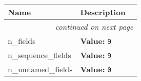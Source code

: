     \vspace{-1cm}
\hspace{\varindent}\begin{longtable}{|p{\varnamewidth}|p{\vardescrwidth}|l}
\cline{1-2}
\cline{1-2} \centering \textbf{Name} & \centering \textbf{Description}& \\
\cline{1-2}
\endhead\cline{1-2}\multicolumn{3}{r}{\small\textit{continued on next page}}\\\endfoot\cline{1-2}
\endlastfoot\raggedright n\-\_\-f\-i\-e\-l\-d\-s\- & \raggedright \textbf{Value:} 
{\tt 9}&\\
\cline{1-2}
\raggedright n\-\_\-s\-e\-q\-u\-e\-n\-c\-e\-\_\-f\-i\-e\-l\-d\-s\- & \raggedright \textbf{Value:} 
{\tt 9}&\\
\cline{1-2}
\raggedright n\-\_\-u\-n\-n\-a\-m\-e\-d\-\_\-f\-i\-e\-l\-d\-s\- & \raggedright \textbf{Value:} 
{\tt 0}&\\
\cline{1-2}
\end{longtable}

